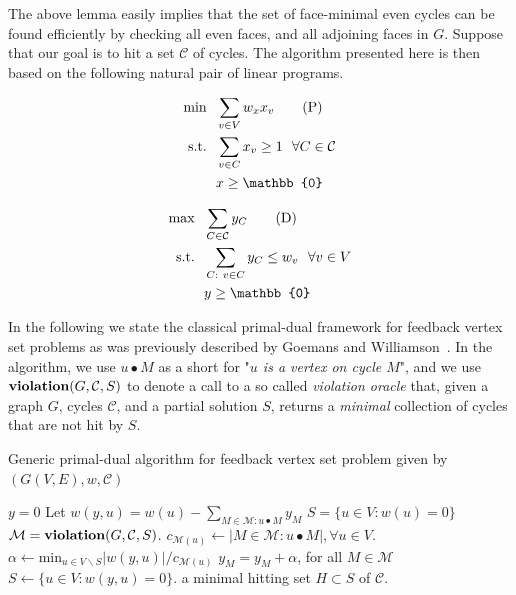 \documentclass[letterpaper,11pt]{article}
\newcommand{\cmd}[1]{\ensuremath{\mbox{\bf #1}}}
\newcommand{\vio}{\ensuremath{\cmd{violation}}}
\newcommand{\st}{\ensuremath{\mbox{s.t.}}}
\newcommand{\MM}{{\mathcal M}}
\newcommand{\CC}{{\ensuremath{\mathcal C}}}
\newcommand{\0}{\mathbb{0}}
\newcommand{\1}{\mathbb{1}}
\begin{document}
The above lemma easily implies that the set of face-minimal even cycles can be found efficiently by 
checking all even faces, and all adjoining faces in $G$. Suppose that our goal is to hit a set $\mathcal{C}$ of cycles. The algorithm presented here is then based on the following natural pair of linear programs.

\medskip
\noindent\hspace*{-4ex}
\begin{minipage}{.47\textwidth}
\begin{align}
    \min ~~ & \sum_{v \in V} w_x x_v \tag{P} \label{primal}\\
    \st ~~ & \sum_{v \in C} x_v \geq 1 ~~ \forall C \in \mathcal{C} \notag\\
    & x \geq \0 \notag
\end{align}
\end{minipage}
\hspace*{.02\textwidth}
\vrule
\hspace*{.02\textwidth}
\begin{minipage}{.47\textwidth}
\begin{align}
\max ~~ & \sum_{C \in \mathcal{C} } y_C \tag{D} \label{dual} \\
\st ~~ &  \sum_{C:  \ v \in C} y_C \leq w_v ~~ \forall v \in V\notag \\
& y \geq \0 \notag
\end{align}
\end{minipage}
\medskip

In the following we state the classical primal-dual framework for feedback vertex set problems as was previously described by Goemans and Williamson~\cite{GW97,GW98}. In the algorithm, we use $u \bullet M$ as a short for "{\em $u$ is a vertex on cycle $M$}", and we use $\vio(G,\CC,S)$ to denote a call to a so called {\em violation oracle} that, given a graph $G$, cycles \CC, and a partial solution $S$, returns a {\em minimal} collection of cycles that are not hit by $S$.

\medskip

\begin{algorithm}[H]
\caption{\cite{GW98}\label{pdalg} Generic primal-dual algorithm 
    for feedback vertex set problem given by $(G(V, E), w, \mathcal{C} )  $  }
\begin{algorithmic}
 \STATE $y  =  0$   
 \STATE Let $w(y,u) =  w(u) -  \sum_{{M \in \mathcal{M} : u \bullet M}}   y_M $ 
 \STATE $S = \{u \in V :   w(u) = 0 \}$
\STATE  $\MM= \vio(G, \CC, S)$.
\STATE $c_{ \MM (u) } \leftarrow |{M \in \MM : u \bullet M}|, \forall u \in V $.
 \STATE $ \alpha 
\leftarrow \text{min}_ {u \in V \backslash S} | w(y,u)| /
c_{\MM(u) } $ 
\STATE  $y_M = y_M + \alpha$, for all $M \in \MM$
$ S \leftarrow \{u \in V :  w(y,u) = 0 \}. $
\ENDWHILE 
\RETURN a minimal hitting set $ H \subset S $ of $\mathcal{C}$.
\end{algorithmic}
\end{algorithm} 
\end{document}
